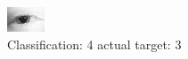 \begin{figure}[h!]
\begin{center}
\includegraphics[width=0.60\columnwidth]{figures/ID171_class_4_target_3.png}
\end{center}
\caption{ Classification: 4 actual target: 3}
\label{fig:ID171_class_4_target_3}
\end{figure}
